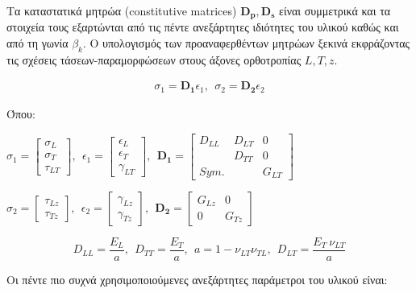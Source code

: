 Τα καταστατικά μητρώα (\textlatin{constitutive matrices}) $\mathbf{D_{p}, D_{s}}$ είναι συμμετρικά και τα στοιχεία τους εξαρτώνται από τις πέντε ανεξάρτητες ιδιότητες του υλικού καθώς και από τη γωνία $\beta_{k}$. Ο υπολογισμός των προαναφερθέντων μητρώων ξεκινά εκφράζοντας τις σχέσεις τάσεων-παραμορφώσεων στους άξονες ορθοτροπίας $L, T, z$.

\begin{equation}    
\begin{array}{r}
\sigma_{1} = \mathbf{D}_{\mathbf{1}}\epsilon_{1},\ \ \sigma_{2} = \mathbf{D}_{\mathbf{2}}\epsilon_{2}
\end{array}
\end{equation}

Όπου:
\begin{center}

$\sigma_{1} = \begin{bmatrix}
\sigma_{L} \\
\sigma_{T} \\
\tau_{LT}
\end{bmatrix},\ \ \epsilon_{1} = \begin{bmatrix}
\epsilon_{L} \\
\epsilon_{T} \\
\gamma_{LT}
\end{bmatrix},\ \ \mathbf{D}_{\mathbf{1}}=\begin{bmatrix}
D_{LL} & D_{LT} & 0 \\
\  & D_{TT} & 0 \\
Sym. & \  & G_{LT}
\end{bmatrix}$

\vspace{10pt}
$\sigma_{2} = \begin{bmatrix}
\tau_{Lz} \\
\tau_{Tz}
\end{bmatrix},\ \ \epsilon_{2} = \begin{bmatrix}
\gamma_{Lz} \\
\gamma_{Tz}
\end{bmatrix},\ \ \mathbf{D}_{\mathbf{2}}=\begin{bmatrix}
G_{Lz} & 0 \\
0 & G_{Tz}
\end{bmatrix}$
\end{center}

\[D_{LL} = \frac{E_{L}}{a},\ \ D_{TT} = \frac{E_{T}}{a},\ \ a = 1 - \nu_{LT}\nu_{TL},\ \ D_{LT} = \frac{E_{T}\ \nu_{LT}}{a}\]

Οι πέντε πιο συχνά χρησιμοποιούμενες ανεξάρτητες παράμετροι του υλικού είναι:

